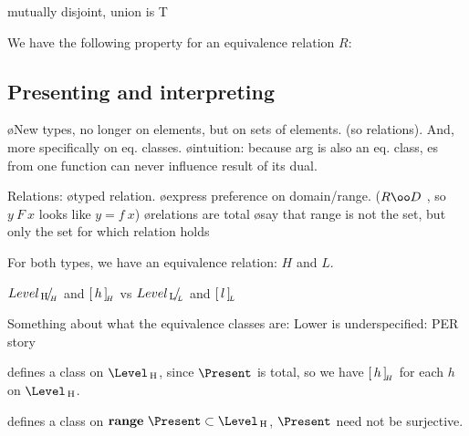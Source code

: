 mutually disjoint, union is T


We have the following property for an equivalence relation $R$:








\subsection{Presenting and interpreting}

\bl
\o New types, no longer on elements, but on sets of elements. (so relations). And, more specifically on eq. classes.
\o intuition: because arg is also an eq. class, es from one function can never influence result of its dual.
\el


Relations: 
\bl
\o typed relation. 
\o express preference on domain/range. ($R \oo D$ , so $y~F~x$ looks like $y = f~x$)
\o relations are total
\o say that range is not the set, but only the set for which relation holds
\el



For both types, we have an equivalence relation: $H$ and $L$. 

${Level_{\, \mathrm H}}\!/_{{_{\!\!{H}}}}$ and $[\,{h}\,]_{{\!_{H}}}$ vs ${Level_{\, \mathrm L}}\!/_{{_{\!\!{L}}}}$ and $[\,{l}\,]_{{\!_{L}}}$ 


Something about what the equivalence classes are: Lower is underspecified: 
PER story

\textdownarrow\textdownarrow\textdownarrow\textdownarrow


defines a class on $\Level\H$, since $\Present$ is total, so we have $[\,{h}\,]_{{\!_{H}}}$ for each $h$ on $\Level\H$.

defines a class on ${\bf range}~\Present \subset \Level\H$, $\Present$ need not be surjective.

